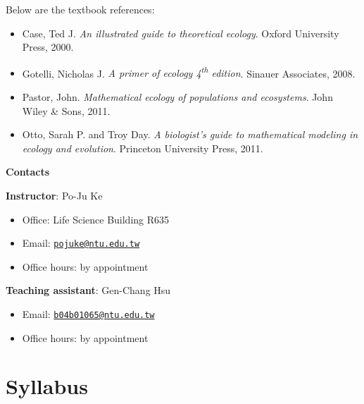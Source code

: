 \documentclass[
]{book}
\providecommand{\tightlist}{%
  \setlength{\itemsep}{0pt}\setlength{\parskip}{0pt}}
\begin{document}
Below are the textbook references:

\begin{itemize}
\tightlist
\item
  Case, Ted J. \emph{An illustrated guide to theoretical ecology}. Oxford University Press, 2000.
\item
  Gotelli, Nicholas J. \emph{A primer of ecology 4\textsuperscript{th} edition}. Sinauer Associates, 2008.
\item
  Pastor, John. \emph{Mathematical ecology of populations and ecosystems}. John Wiley \& Sons, 2011.
\item
  Otto, Sarah P. and Troy Day. \emph{A biologist's guide to mathematical modeling in ecology and evolution}. Princeton University Press, 2011.
\end{itemize}

\textbf{Contacts}

\textbf{Instructor}: Po-Ju Ke

\begin{itemize}
\tightlist
\item
  Office: Life Science Building R635
\item
  Email: \href{mailto:pojuke@ntu.edu.tw}{\nolinkurl{pojuke@ntu.edu.tw}}
\item
  Office hours: by appointment
\end{itemize}

\textbf{Teaching assistant}: Gen-Chang Hsu

\begin{itemize}
\tightlist
\item
  Email: \href{mailto:b04b01065@ntu.edu.tw}{\nolinkurl{b04b01065@ntu.edu.tw}}
\item
  Office hours: by appointment
\end{itemize}

\hypertarget{syllabus}{%
\chapter*{Syllabus}\label{syllabus}}

\begingroup\fontsize{17}{19}\selectfont
\end{document}
